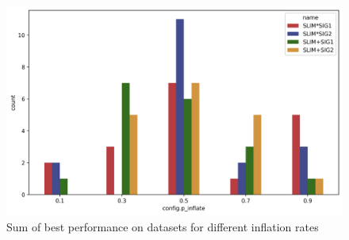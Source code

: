 
    \begin{figure}[h]
    \centering
    \includegraphics[width=\linewidth]{figures/countplot_rmse.png}
    \caption{Sum of best performance on datasets for different inflation rates}
    \label{fig:countplot_rmse}
    \end{figure}
    